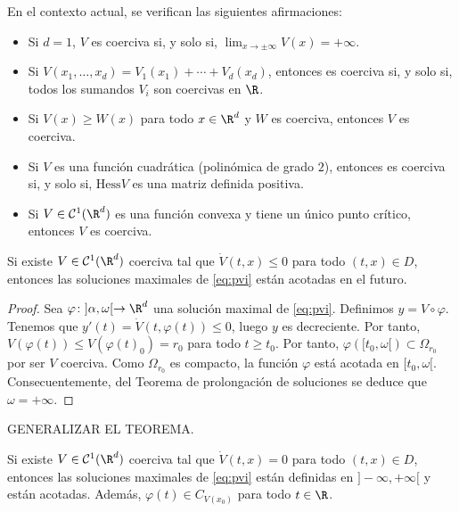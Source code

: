 \documentclass{article}
\begin{document}
\begin{prop}
  En el contexto actual, se verifican las siguientes afirmaciones:
  \begin{itemize}
  \item Si $d = 1$, $V$ es coerciva si, y solo si, $\lim_{x \to \pm \infty}V(x) = +\infty$.
  \item Si $V(x_1, \ldots, x_d) = V_1(x_1)+ \cdots + V_d(x_d)$, entonces es coerciva si, y solo si,
    todos los sumandos $V_i$ son coercivas en $\R$.
  \item Si $V(x) \ge W(x)$ para todo $x \in \R^d$ y $W$ es coerciva, entonces $V$ es coerciva.
  \item Si $V$ es una función cuadrática (polinómica de grado $2$), entonces es coerciva si, y solo
    si, $\mathrm{Hess} V$ es una matriz definida positiva.
  \item Si $V \in \mathcal{C}^1(\R^d)$ es una función convexa y tiene un único punto crítico,
    entonces $V$ es coerciva.
  \end{itemize}
\end{prop}

\begin{theorem}
  \label{thm:guia}
  Si existe $V\in \mathcal{C}^1(\R^d)$ coerciva tal que $\dot{V}(t,x) \le 0$ para todo
  $(t,x) \in D$, entonces las soluciones maximales de \eqref{eq:pvi} están acotadas en el futuro.
\end{theorem}
\begin{proof}
  Sea $\varphi \colon ]\alpha, \omega[ \to \R^d$ una solución maximal de \eqref{eq:pvi}. Definimos
  $y = V \circ \varphi$. Tenemos que $y'(t) = \dot{V}(t, \varphi(t)) \le 0$, luego $y$ es
  decreciente. Por tanto, $V(\varphi(t)) \le V(\varphi(t)_0) = r_0$ para todo $t \ge t_0$. Por
  tanto, $\varphi([t_0, \omega[) \subset \Omega_{r_0}$ por ser $V$ coerciva. Como $\Omega_{r_0}$ es
  compacto, la función $\varphi$ está acotada en $[t_0, \omega[$. Consecuentemente, del Teorema de
  prolongación de soluciones se deduce que $\omega = +\infty$.
\end{proof}

GENERALIZAR EL TEOREMA.

\begin{corollary}
  Si existe $V\in \mathcal{C}^1(\R^d)$ coerciva tal que $\dot{V}(t,x) = 0$ para todo $(t,x) \in D$,
  entonces las soluciones maximales de \eqref{eq:pvi} están definidas en $]-\infty, +\infty[$ y
  están acotadas. Además, $\varphi(t) \in C_{V(x_0)}$ para todo $t \in \R$.
\end{corollary}
\end{document}
